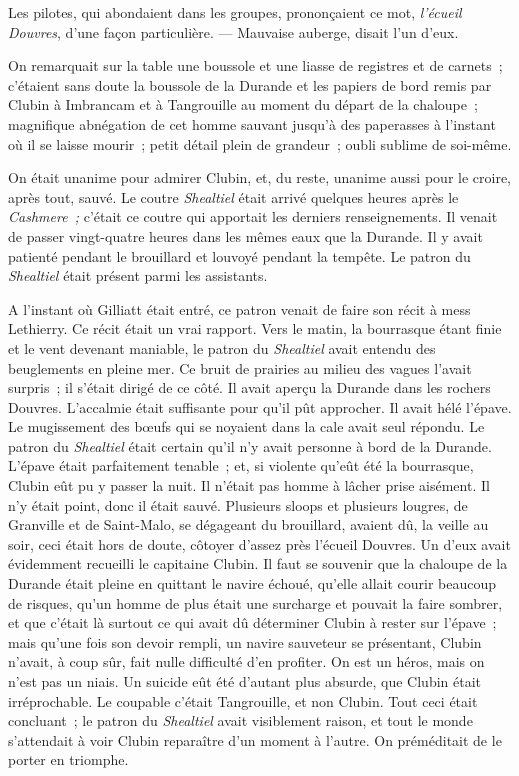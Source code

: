 \documentclass[french,twoside]{book} %
\begin{document}
Les pilotes, qui abondaient dans les groupes, prononçaient ce mot, \emph{l’écueil Douvres}, d’une façon particulière. — Mauvaise auberge, disait l’un d’eux.\par
On remarquait sur la table une boussole et une liasse de registres et de carnets ; c’étaient sans doute la boussole de la Durande et les papiers de bord remis par Clubin à Imbrancam et à Tangrouille au moment du départ de la chaloupe ; magnifique abnégation de cet homme sauvant jusqu’à des paperasses à l’instant où il se laisse mourir ; petit détail plein de grandeur ; oubli sublime de soi-même.\par
On était unanime pour admirer Clubin, et, du reste, unanime aussi pour le croire, après tout, sauvé. Le coutre \emph{Shealtiel} était arrivé quelques heures après le \emph{Cashmere ;} c’était ce coutre qui apportait les derniers  renseignements. Il venait de passer vingt-quatre heures dans les mêmes eaux que la Durande. Il y avait patienté pendant le brouillard et louvoyé pendant la tempête. Le patron du \emph{Shealtiel} était présent parmi les assistants.\par
A l’instant où Gilliatt était entré, ce patron venait de faire son récit à mess Lethierry. Ce récit était un vrai rapport. Vers le matin, la bourrasque étant finie et le vent devenant maniable, le patron du \emph{Shealtiel} avait entendu des beuglements en pleine mer. Ce bruit de prairies au milieu des vagues l’avait surpris ; il s’était dirigé de ce côté. Il avait aperçu la Durande dans les rochers Douvres. L’accalmie était suffisante pour qu’il pût approcher. Il avait hélé l’épave. Le mugissement des bœufs qui se noyaient dans la cale avait seul répondu. Le patron du \emph{Shealtiel} était certain qu’il n’y avait personne à bord de la Durande. L’épave était parfaitement tenable ; et, si violente qu’eût été la bourrasque, Clubin eût pu y passer la nuit. Il n’était pas homme à lâcher prise aisément. Il n’y était point, donc il était sauvé. Plusieurs sloops et plusieurs lougres, de Granville et de Saint-Malo, se dégageant du brouillard, avaient dû, la veille au soir, ceci était hors de doute, côtoyer d’assez près l’écueil Douvres. Un d’eux avait évidemment recueilli le capitaine Clubin. Il faut se souvenir que la chaloupe de la Durande était pleine en quittant le navire échoué, qu’elle allait courir beaucoup de risques, qu’un homme de plus était une surcharge et pouvait la faire sombrer, et que c’était là surtout ce qui avait dû déterminer Clubin à rester sur  l’épave ; mais qu’une fois son devoir rempli, un navire sauveteur se présentant, Clubin n’avait, à coup sûr, fait nulle difficulté d’en profiter. On est un héros, mais on n’est pas un niais. Un suicide eût été d’autant plus absurde, que Clubin était irréprochable. Le coupable c’était Tangrouille, et non Clubin. Tout ceci était concluant ; le patron du \emph{Shealtiel} avait visiblement raison, et tout le monde s’attendait à voir Clubin reparaître d’un moment à l’autre. On préméditait de le porter en triomphe.\par
\end{document}

